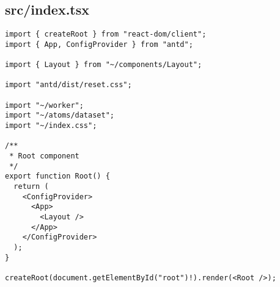 \subsection{src/index.tsx}
\begin{verbatim}
import { createRoot } from "react-dom/client";
import { App, ConfigProvider } from "antd";

import { Layout } from "~/components/Layout";

import "antd/dist/reset.css";

import "~/worker";
import "~/atoms/dataset";
import "~/index.css";

/**
 * Root component
 */
export function Root() {
  return (
    <ConfigProvider>
      <App>
        <Layout />
      </App>
    </ConfigProvider>
  );
}

createRoot(document.getElementById("root")!).render(<Root />);

\end{verbatim}
